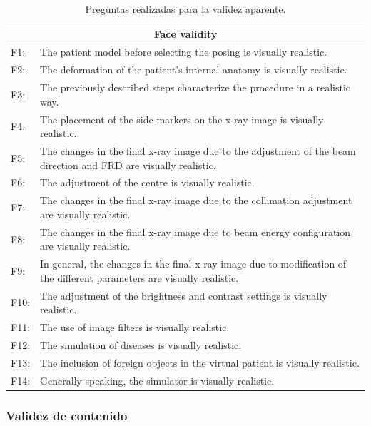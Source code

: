 \begin{table}[hb]
    \centering
    \begin{tabular}{lp{14cm}}
    \hline
    \multicolumn{2}{c}{Face validity }
    \\
    \hline
    F1:     &  The patient model before selecting the posing is visually realistic.  \\
    F2:     & The deformation of the patient’s internal anatomy is visually realistic.  \\
    F3:     & The previously described steps characterize the procedure in a realistic way.  \\
    F4:     & The placement of the side markers on the x-ray image is visually realistic.   \\
    F5:     & The changes in the final x-ray image due to the adjustment of the beam direction and FRD are visually realistic.  \\
    F6:     & The adjustment of the centre is visually realistic. \\
    F7:     & The changes in the final x-ray image due to the collimation adjustment are visually realistic.  \\
    F8:     & The changes in the final x-ray image due to beam energy configuration are visually realistic.  \\
    F9:     & In general, the changes in the final x-ray image due to modification of the different parameters are visually realistic. \\
    F10:     & The adjustment of the brightness and contrast settings is visually realistic.  \\
    F11:     & The use of image filters is visually realistic.  \\
    F12:     & The simulation of diseases is visually realistic.  \\
    F13:     & The inclusion of foreign objects in the virtual patient is visually realistic.  \\
    F14:     & Generally speaking, the simulator is visually realistic.  \\
    
    \hline
    \end{tabular}
    \caption{Preguntas realizadas para la validez aparente.}
    \label{tab:facevalidity}
\end{table}
\clearpage
\subsubsection{Validez de contenido}

